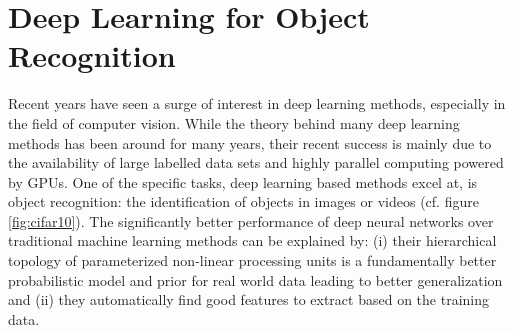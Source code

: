 \section{Deep Learning for Object Recognition}
Recent years have seen a surge of interest in deep learning methods, especially in the field of computer vision. While the theory behind many deep learning methods has been around for many years, their recent success is mainly due to the availability of large labelled data sets and highly parallel computing powered by GPUs. One of the specific tasks, deep learning based methods excel at, is object recognition: the identification of objects in images or videos (cf. figure \ref{fig:cifar10}). The significantly better performance of deep neural networks over traditional machine learning methods can be explained by: (i) their hierarchical topology of parameterized non-linear processing units is a fundamentally better probabilistic model and prior for real world data leading to better generalization and (ii) they automatically find good features to extract based on the training data.
